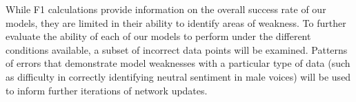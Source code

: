 \documentclass[11pt]{article}
\begin{document}
While F1 calculations provide information on the overall success rate of our
models, they are limited in their ability to identify areas of weakness. To
further evaluate the ability of each of our models to perform under the different
conditions available, a subset of incorrect data points will be examined.
Patterns of errors that demonstrate model weaknesses with a particular type of
data (such as difficulty in correctly identifying neutral sentiment in male
voices) will be used to inform further iterations of network updates.



\end{document}
